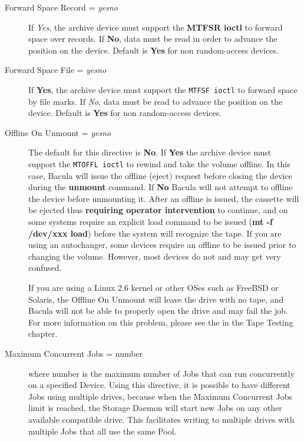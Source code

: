 \begin{description}
\item [Forward Space Record = {\it yes\vb{}no}]
   If {\it Yes}, the archive device must support the {\bf MTFSR  ioctl} to
   forward space over records. If {\bf No}, data must  be read in order to
   advance the position on the device. Default is  {\bf Yes} for non
   random-access devices. 

\item [Forward Space File = {\it yes\vb{}no}]
   If {\bf Yes}, the archive device must support the {\tt MTFSF  ioctl} to
   forward space by file marks. If {\it No}, data  must be read to advance the
   position on the device. Default is  {\bf Yes} for non random-access devices. 

\item [Offline On Unmount = {\it yes\vb{}no}]
   The default for this directive is {\bf No}. If {\bf Yes} the  archive device
   must support the {\tt MTOFFL ioctl} to rewind and  take the volume offline. In
   this case, Bacula will issue the  offline (eject) request before closing the
   device during the {\bf unmount}  command. If {\bf No} Bacula will not attempt
   to offline the  device before unmounting it. After an offline is issued,  the
   cassette will be ejected thus {\bf requiring operator intervention}  to
   continue, and on some systems require an explicit load command  to be issued
   ({\bf mt -f /dev/xxx load}) before the system will recognize  the tape. If you
   are using an autochanger, some devices  require an offline to be issued prior
   to changing the volume. However,  most devices do not and may get very
   confused.  

   If you are using a Linux 2.6 kernel or other OSes
   such as FreeBSD or Solaris, the Offline On Unmount will leave the drive
   with no tape, and Bacula will not be able to properly open the drive and
   may fail the job.  For more information on this problem, please see the
    in the Tape
   Testing chapter.

\item [Maximum Concurrent Jobs = \lt{}number\gt{}]
   where \lt{}number\gt{} is the maximum number of Jobs that can run
   concurrently on a specified Device.  Using this directive, it is possible
   to have different Jobs using multiple drives, because when 
   the Maximum Concurrent Jobs limit is
   reached, the Storage Daemon will start new Jobs on any other available
   compatible drive.  This facilitates writing to multiple drives with
   multiple Jobs that all use the same Pool.


\end{description}
